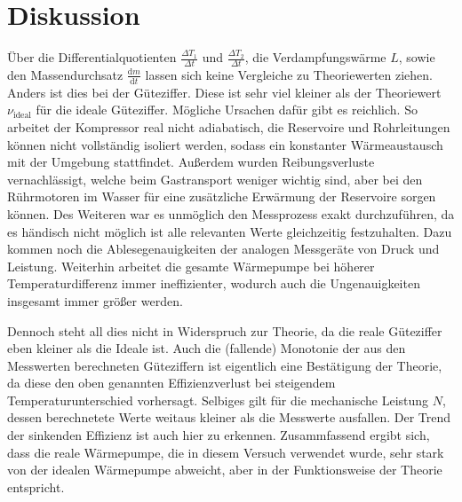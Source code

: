 \section{Diskussion}
\label{sec:Diskussion}
Über die Differentialquotienten $\frac{\Delta T_1}{\Delta t}$ und $\frac{\Delta T_2}{\Delta t}$, die Verdampfungswärme $L$, sowie den Massendurchsatz $\frac{\text{d}m}{\text{d}t}$
lassen sich keine Vergleiche zu Theoriewerten ziehen. 
Anders ist dies bei der Güteziffer. Diese ist sehr viel kleiner als der Theoriewert $\nu_{\text{ideal}}$ für die ideale Güteziffer. 
Mögliche Ursachen dafür gibt es reichlich. So arbeitet
der Kompressor real nicht adiabatisch, die Reservoire und Rohrleitungen können nicht vollständig isoliert werden, sodass 
ein konstanter Wärmeaustausch mit der Umgebung stattfindet. Außerdem wurden 
Reibungsverluste vernachlässigt, welche beim Gastransport weniger wichtig sind, aber bei den Rührmotoren im Wasser für eine zusätzliche Erwärmung der Reservoire sorgen können. 
Des Weiteren war es unmöglich den Messprozess exakt durchzuführen, da es händisch nicht möglich ist alle relevanten Werte gleichzeitig festzuhalten. Dazu kommen noch die 
Ablesegenauigkeiten der analogen Messgeräte von Druck und Leistung. Weiterhin arbeitet die gesamte Wärmepumpe bei höherer Temperaturdifferenz
immer ineffizienter, wodurch auch die Ungenauigkeiten insgesamt immer größer werden. 

Dennoch steht all dies nicht in Widerspruch zur Theorie, da die reale Güteziffer eben kleiner
als die Ideale ist. Auch die (fallende) Monotonie der aus den Messwerten berechneten Güteziffern ist eigentlich eine Bestätigung der Theorie, da diese den oben genannten
Effizienzverlust bei steigendem Temperaturunterschied vorhersagt. Selbiges gilt für die mechanische Leistung $N$, dessen berechnetete Werte weitaus kleiner als die Messwerte
ausfallen. Der Trend der sinkenden Effizienz ist auch hier zu erkennen. 
Zusammfassend ergibt sich, dass die reale Wärmepumpe, die in diesem Versuch verwendet wurde, sehr stark von der idealen Wärmepumpe abweicht, aber in der Funktionsweise der
Theorie entspricht.